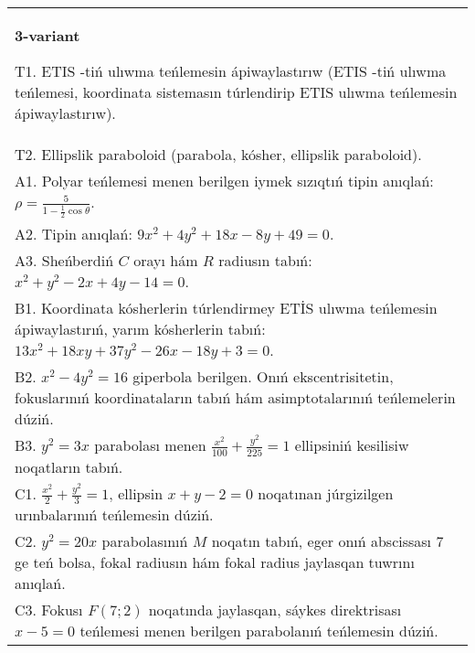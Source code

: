 \documentclass{article}
\begin{document}
\begin{tabular}{m{17cm}}
\textbf{3-variant}
\newline

T1. ETIS -tiń ulıwma teńlemesin ápiwaylastırıw (ETIS -tiń ulıwma teńlemesi, koordinata sistemasın túrlendirip ETIS ulıwma teńlemesin ápiwaylastırıw).\\

T2. Ellipslik paraboloid (parabola, kósher, ellipslik paraboloid).\\

A1. Polyar teńlemesi menen berilgen iymek sızıqtıń tipin anıqlań: $\rho=\frac{5}{1-\frac{1}{2}\cos\theta}$.\\

A2. Tipin anıqlań: $9 x^{2}+4 y^{2}+18 x-8 y+49=0$.\\

A3. Sheńberdiń $C$ orayı hám $R$ radiusın tabıń: $x^2+y^2-2 x+4 y-14=0$.\\

B1. Koordinata kósherlerin túrlendirmey ETİS ulıwma teńlemesin ápiwaylastırıń, yarım kósherlerin tabıń: $13x^{2} + 18xy + 37y^{2} - 26x - 18y + 3 = 0$.  \\

B2. $x^{2} - 4y^{2} = 16$ giperbola berilgen. Onıń ekscentrisitetin, fokuslarınıń koordinataların tabıń hám asimptotalarınıń teńlemelerin dúziń.\\

B3. $y^{2} = 3x$ parabolası menen $\frac{x^{2}}{100} + \frac{y^{2}}{225} = 1$ ellipsiniń kesilisiw noqatların tabıń.  \\

C1. $\frac{x^{2}}{2} + \frac{y^{2}}{3} = 1$, ellipsin $x + y - 2 = 0$ noqatınan júrgizilgen urınbalarınıń teńlemesin dúziń.  \\

C2. $y^{2} = 20x$ parabolasınıń $M$ noqatın tabıń, eger onıń abscissası 7 ge teń bolsa, fokal radiusın hám fokal radius jaylasqan tuwrını anıqlań.\\

C3. Fokusı $F(7;2)$ noqatında jaylasqan, sáykes direktrisası $x - 5 = 0$ teńlemesi menen berilgen parabolanıń teńlemesin dúziń.  \\

\end{tabular}
\vspace{1cm}
\end{document}
